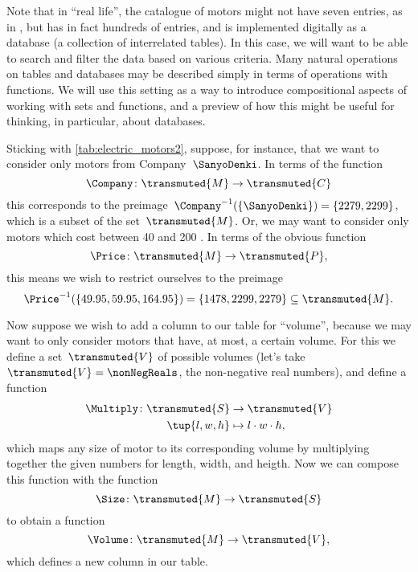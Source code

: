 Note that in ``real life'', the catalogue of motors might not have seven entries, as in \XXX, but has in fact hundreds of entries, and is implemented digitally as a database (a collection of interrelated tables).
In this case, we will want to be able to search and filter the data based on various criteria.
Many natural operations on tables and databases may be described simply in terms of operations with functions.
We will use this setting as a way to introduce compositional aspects of working with sets and functions, and a preview of how this might be useful for thinking, in particular, about databases.

Sticking with \cref{tab:electric_motors2}, suppose, for instance, that we want to consider only motors from Company~$\SanyoDenki$.
In terms of the function
\begin{equation*}
    \Company\colon \transmuted{M} \to \transmuted{C}
\end{equation*}
this corresponds to the preimage~$\Company^{-1}(\{\SanyoDenki \}) = \{2279, 2299\}$, which is a subset of the set~$\transmuted{M}$.
Or, we may want to consider only motors which cost between 40 and 200 \USD.
In terms of the obvious function
\begin{equation*}
    \Price\colon \transmuted{M} \to \transmuted{P},
\end{equation*}
this means we wish to restrict ourselves to the preimage
\begin{equation*}
    \Price^{-1}(\{ 49.95, 59.95, 164.95\}) = \{ 1478, 2299, 2279 \} \subseteq \transmuted{M}.
\end{equation*}
%

Now suppose we wish to add a column to our table for ``volume'', because we may want to only consider motors that have, at most, a certain volume.
For this we define a set~$\transmuted{V}$ of possible volumes (let's take~$\transmuted{V} = \nonNegReals$, the non-negative real numbers), and define a function
\begin{equation*}
    \begin{aligned}
        \Multiply \colon \transmuted{S} &\to \transmuted{V}\\
        \tup{l, w, h} &\mapsto l \cdot w \cdot h,
    \end{aligned}
\end{equation*}
which maps any size of motor to its corresponding volume by multiplying together the given numbers for length, width, and heigth.
Now we can compose this function with the function
\begin{equation*}
    \Size \colon \transmuted{M} \to \transmuted{S}
\end{equation*}
to obtain a function
\begin{equation*}
    \Volume\colon \transmuted{M} \to \transmuted{V},
\end{equation*}
which defines a new column in our table.


